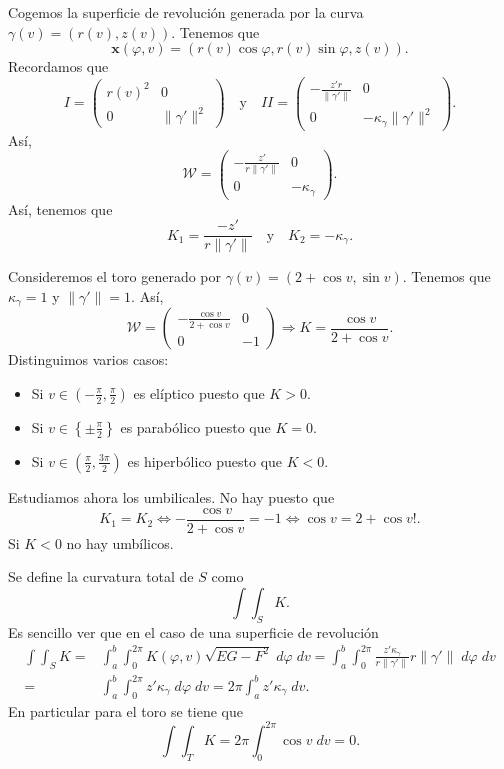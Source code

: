 \begin{eg}
Cogemos la superficie de revolución generada por la curva $\displaystyle \gamma\left(v\right)=\left(r\left(v\right), z\left(v\right)\right) $. Tenemos que 
\[ \textbf{x} \left(\varphi, v\right)=\left(r\left(v\right)\cos\varphi, r\left(v\right)\sin\varphi, z\left(v\right)\right) .\]
Recordamos que 
\[I = \begin{pmatrix} r\left(v\right)^{2} & 0 \\ 0 & \|\gamma'\|^{2} \end{pmatrix}\quad \text{y} \quad II =\begin{pmatrix} -\frac{z'r}{\|\gamma'\|} & 0 \\ 0 & -\kappa_{\gamma }\|\gamma'\|^{2} \end{pmatrix} .\]
Así, 
\[\mathcal{W}=\begin{pmatrix} -\frac{z'}{r\|\gamma'\|} & 0 \\ 0 & -\kappa_{\gamma } \end{pmatrix} .\]
Así, tenemos que 
\[K_{1}=\frac{-z'}{r\|\gamma'\|} \quad \text{y} \quad K_{2}=-\kappa_{\gamma } .\]
\end{eg}
\begin{eg}
Consideremos el toro generado por $\displaystyle \gamma\left(v\right)=\left(2+\cos v, \sin v\right) $. Tenemos que $\displaystyle \kappa_{\gamma }=1 $ y $\displaystyle \|\gamma'\|=1 $. Así, 
\[\mathcal{W}=\begin{pmatrix} -\frac{\cos v}{2 + \cos v} & 0 \\ 0 & - 1 \end{pmatrix}\Rightarrow K = \frac{\cos v}{2 + \cos v} .\]
Distinguimos varios casos:
\begin{itemize}
\item Si $\displaystyle v \in \left(-\frac{\pi }{2}, \frac{\pi }{2}\right) $ es elíptico puesto que $\displaystyle K > 0 $. 
\item Si $\displaystyle v \in \left\{ \pm \frac{\pi }{2}\right\}  $ es parabólico puesto que $\displaystyle K = 0 $. 
\item Si $\displaystyle v \in \left(\frac{\pi }{2}, \frac{3\pi }{2}\right) $ es hiperbólico puesto que $\displaystyle K < 0 $. 
\end{itemize}
Estudiamos ahora los umbilicales. No hay puesto que 
\[K_{1}=K_{2}\iff -\frac{\cos v}{2 + \cos v}= - 1 \iff \cos v = 2 + \cos v !.\]
Si $\displaystyle K < 0 $ no hay umbílicos. 
\end{eg}
\begin{eg}
Se define la curvatura total de $\displaystyle S $ como
\[\int \int _{S}K  .\]
Es sencillo ver que en el caso de una superficie de revolución
\[
\begin{split}
	\int \int _{S}K = & \int^{b}_{a} \int^{2\pi }_{0} K\left(\varphi, v\right)\sqrt{EG-F^{2}} \; d\varphi \; dv = \int^{b}_{a} \int^{2\pi }_{0} \frac{z'\kappa_{\gamma }}{r\|\gamma'\|}r\|\gamma'\| \; d\varphi \; dv\\
	= & \int^{b}_{a} \int^{2\pi }_{0} z'\kappa_{\gamma } \; d\varphi \; dv = 2\pi \int^{b}_{a} z'\kappa_{\gamma } \; dv.
\end{split}
\]
En particular para el toro se tiene que 
\[\int \int _{T}K =2\pi \int^{2\pi }_{0} \cos v \; dv = 0 .\]
\end{eg}
